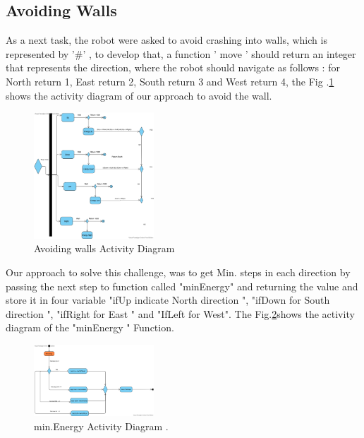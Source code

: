 \documentclass[10pt,journal,compsoc]{IEEEtran}
\begin{document}
\subsection{Avoiding Walls }

As a next task, the robot were asked to avoid crashing into walls, which is represented by '\#' , to develop that, a function ' move ' should return  an integer that represents the direction, where the robot should navigate as follows : for  North return 1,  East return 2,  South return  3
and West return  4, the Fig .\ref{wallAct} shows the activity diagram of our approach to avoid the wall.


\begin{figure}[!h]
	\centering
	\includegraphics[width=0.4\textwidth]{wall.png}
	\caption{\label{wallAct}Avoiding walls  Activity Diagram }
	
\end{figure}


Our approach to solve this challenge, was to get  Min. steps in each direction by passing the next step to function called "minEnergy" and returning the value and store it in four variable "ifUp indicate North direction ", "ifDown for South direction ", "ifRight for East " and "IfLeft for West". The Fig.\ref{MinEnAct}shows  the activity diagram of the "minEnergy " Function. 

\begin{figure}[!h]
	
	\centering
	\includegraphics[width=0.4\textwidth]{MinEnergy.png}
	\caption{\label{MinEnAct}min.Energy Activity Diagram .}
	
\end{figure}
\end{document}
